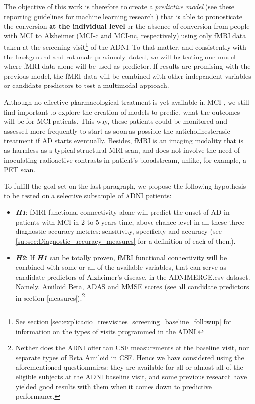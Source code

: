 \documentclass[a4paper,12pt]{elsarticle}  %
\begin{document}
	The objective of this work is therefore to create a \textit{predictive model} (see these reporting guidelines for machine learning research \cite{Luo2016}) that is able to pronosticate the conversion \textbf{at the individual level} or the absence of conversion from people with MCI to Alzheimer (MCI-c and MCI-nc, respectively) using only fMRI data taken at the screening visit\footnote{See section \ref{sec:explicacio_tresvisites_screening_baseline_followup} for information on the types of visits programmed in the ADNI.} of the ADNI. To that matter, and consistently with the background and rationale previously stated, we will be testing one model where fMRI data alone will be used as predictor. If results are promising with the previous model, the fMRI data will be combined with other independent variables or candidate predictors to test a multimodal approach.
	
	Although no effective pharmacological treatment is yet available in MCI \cite{Herukka2017285}, we still find important to explore the creation of models to predict what the outcomes will be for MCI patients. This way, these patients could be monitored and assessed more frequently to start as soon as possible the anticholinesterasic treatment if AD starts eventually. Besides, fMRI is an imaging modality that is as harmless as a typical structural MRI scan, and does not involve the need of inoculating radioactive contrasts in patient's bloodstream, unlike, for example, a PET scan.
	
	To fulfill the goal set on the last paragraph, we propose the following hypothesis to be tested on a selective subsample of ADNI patients:

\begin{itemize}
	
	\item \textit{\textbf{H1}}: fMRI functional connectivity alone will predict the onset of AD in patients with MCI in 2 to 5 years time, above chance level in all these three diagnostic accuracy metrics: sensitivity, specificity and accuracy (see \ref{subsec:Diagnostic_accuracy_measures} for a definition of each of them).
	
	\item \textit{\textbf{H2}}: If \textit{\textbf{H1}} can be totally proven, fMRI functional connectivity will be combined with some or all of the available variables, that can serve as candidate predictors of Alzheimer's disease, in the ADNIMERGE.csv dataset. Namely, Amiloid Beta, ADAS and MMSE scores (see all candidate predictors in section \ref{measures}).\footnote{Neither does the ADNI offer tau CSF measurements at the baseline visit, nor separate types of Beta Amiloid in CSF. Hence we have considered using the aforementioned questionnaires: they are available for all or almost all of the eligible subjects at the ADNI baseline visit, and some previous research have yielded good results with them when it comes down to predictive performance.}
	
\end{itemize}
\end{document}
